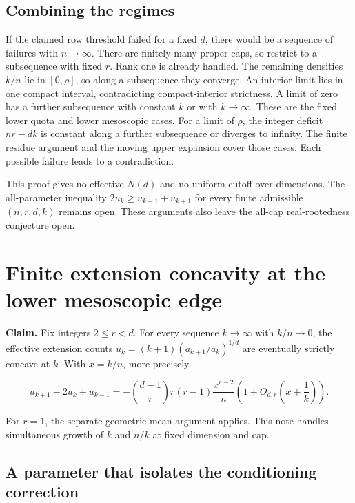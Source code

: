 \documentclass[11pt]{article}
\begin{document}
\subsection{Combining the regimes}

If the claimed row threshold failed for a fixed $d$, there would be a sequence of failures with $n\to\infty$. There are finitely many proper caps, so restrict to a subsequence with fixed $r$. Rank one is already handled. The remaining densities $k/n$ lie in $[0,\rho]$, so along a subsequence they converge. An interior limit lies in one compact interval, contradicting compact-interior strictness. A limit of zero has a further subsequence with constant $k$ or with $k\to\infty$. These are the fixed lower quota and \hyperref[sec:lower]{lower mesoscopic} cases. For a limit of $\rho$, the integer deficit $nr-dk$ is constant along a further subsequence or diverges to infinity. The finite residue argument and the moving upper expansion cover those cases. Each possible failure leads to a contradiction.

This proof gives no effective $N(d)$ and no uniform cutoff over dimensions. The all-parameter inequality $2u_k\ge u_{k-1}+u_{k+1}$ for every finite admissible $(n,r,d,k)$ remains open. These arguments also leave the all-cap real-rootedness conjecture open.

\section{Finite extension concavity at the lower mesoscopic edge}\label{sec:lower}

\textbf{Claim.} Fix integers $2\le r<d$. For every sequence $k\to\infty$ with $k/n\to0$, the effective extension counts $u_k=(k+1)(a_{k+1}/a_k)^{1/d}$ are eventually strictly concave at $k$. With $x=k/n$, more precisely,

\begin{equation*}
u_{k+1}-2u_k+u_{k-1}
=-\binom{d-1}{r}r(r-1)\frac{x^{r-2}}{n}
\left(1+O_{d,r}\left(x+\frac1k\right)\right).
\end{equation*}

For $r=1$, the separate geometric-mean argument applies. This note handles simultaneous growth of $k$ and $n/k$ at fixed dimension and cap.

\subsection{A parameter that isolates the conditioning correction}
\end{document}
